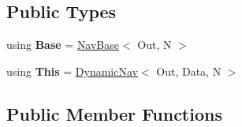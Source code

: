 \subsection*{Public Types}
\begin{DoxyCompactItemize}
\item 
\mbox{\label{classDynamicNav_a388b8132b1dab02f954448917eec121e}} 
using {\bfseries Base} = \hyperlink{classNavBase}{Nav\+Base}$<$ Out, N $>$
\item 
\mbox{\label{classDynamicNav_a87dc6c1f5969829af5e073e6d102c443}} 
using {\bfseries This} = \hyperlink{classDynamicNav}{Dynamic\+Nav}$<$ Out, Data, N $>$
\end{DoxyCompactItemize}
\subsection*{Public Member Functions}
